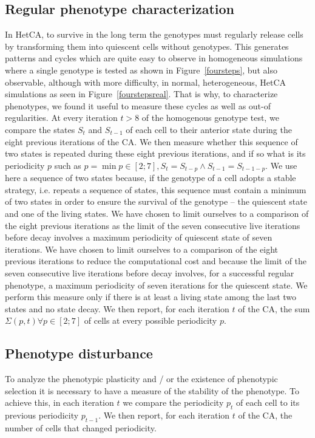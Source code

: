 \subsection{Regular phenotype characterization} 
In HetCA, to survive in the long term the genotypes must regularly release cells by transforming them into quiescent cells without genotypes. This generates patterns and cycles which are quite easy to observe in homogeneous simulations where a single genotype is tested as shown in Figure~\ref{foursteps}, but also observable, although with more difficulty, in normal, heterogeneous, HetCA simulations as seen in Figure~\ref{fourstepsreal}. That is why, to characterize phenotypes, we found it useful to measure these cycles as well as out-of regularities. At every iteration $t>8$ of the homogenous genotype test, we compare the states $S_t$ and $S_{t-1}$ of each cell to their anterior state during the eight previous iterations of the CA. We then measure whether this sequence of two states is repeated during these eight previous iterations, and if so what is its periodicity $p$ such as $p=\min p \in [2;7], S_t=S_{t-p} \wedge S_{t-1}=S_{t-1-p}$. We use here a sequence of two states because, if the genotype of a cell adopts a stable strategy, i.e. repeats a sequence of states, this sequence must contain a minimum of two states in order to ensure the survival of the genotype -- the quiescent state and one of the living states. We have chosen to limit ourselves to a comparison of the eight previous iterations as the limit of the seven consecutive live iterations before decay involves a maximum periodicity of quiescent state of seven iterations. We have chosen to limit ourselves to a comparison of the eight previous iterations to reduce the computational cost and because the limit of the seven consecutive live iterations before decay involves, for a successful regular phenotype, a maximum periodicity of seven iterations for the quiescent state. We perform this measure only if there is at least a living state among the last two states and no state decay. We then report, for each iteration $t$ of the CA, the sum $\Sigma(p,t)\forall p \in [2;7]$ of cells at every possible periodicity $p$. 

\subsection{Phenotype disturbance} 
To analyze the phenotypic plasticity and / or the existence of phenotypic selection it is necessary to have a measure of the stability of the phenotype. To achieve this, in each iteration $t$ we compare the periodicity $p_t$ of each cell to its previous periodicity $p_{t-1}$. We then report, for each iteration $t$ of the CA, the number of cells that changed periodicity.
 
